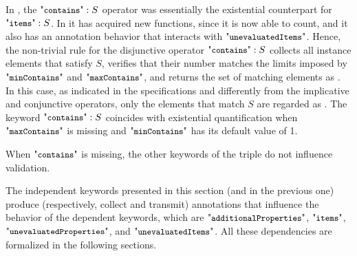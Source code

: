 {In {\cJS}, the $\qcont: S$ operator was essentially the existential counterpart for
$\qits: S$. In {\mJS} it has acquired new functions, since it is now able to count, and
it also has an annotation behavior that interacts with $\qunIts$.
Hence, the non-trivial rule for the disjunctive operator $\acont : S$ collects all instance elements 
that satisfy $S$, verifies that their number matches the limits imposed by $\qminC$ and $\qmaxC$,
and returns the set of matching elements as {\evaluated}. In this case, as indicated in the specifications
and differently from the implicative and conjunctive operators, only the elements that match $S$ are
regarded as {\evaluated}.
The keyword $\qcont: S$ coincides with existential quantification when $\qmaxC$ is missing and
$\qminC$ has its default value of 1.



{
}

{
}

When $\qcont$ is missing, the other keywords of the triple do not influence validation.


}%

The independent keywords presented in this section (and in the previous one) produce (respectively, collect and transmit)
annotations that influence the behavior of the
dependent keywords, which are $\aaddProps$, $\aits$, $\aunProps$, and $\aunIts$. 
All these dependencies are formalized in the following sections.

